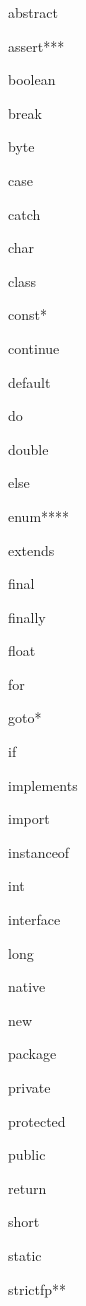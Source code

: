 \documentclass[11pt,a4paper]{article}
\begin{document}
\begin{multicols}{4}
 \begin{description}
  \item abstract
  \item assert***
  \item boolean
  \item break
  \item byte
  \item case
  \item catch
  \item char
  \item class
  \item const*
  \item continue
  \item default
  \item do
  \end{description}
   
 \begin{description}
  \item double  
  \item else
  \item enum****
  \item extends 
  \item final
  \item finally
  \item float
  \item for
  \item goto*
  \item if
  \item implements
  \item import
  \item instanceof
  \end{description}
   
 \begin{description}
  \item int
  \item interface
  \item long
  \item native
  \item new
  \item package
  \item private
  \item protected 
  \item public
  \item return
  \item short
  \item static
  \item strictfp**
  \end{description}
   

\end{multicols}
\end{document}
